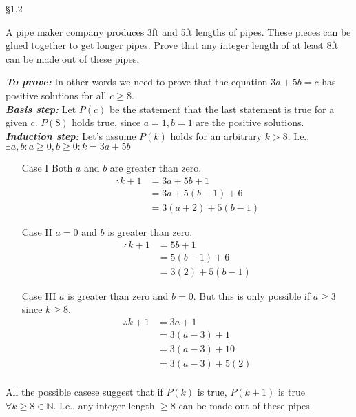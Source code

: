 \documentclass[boxes, qed]{homework}
\begin{document}
\newenvironment{amatrix}[1]{%
  \left[\begin{array}{@{}*{#1}{c}|c@{}}
}{%
  \end{array}\right]
}

\newenvironment{augmatrix}[1]{%
  \left[\begin{array}{#1}
}{%
  \end{array}\right]
}

\S1.2
\begin{problem}
    A pipe maker company produces 3ft and 5ft lengths of pipes. 
    These pieces can be glued together to get longer pipes. 
    Prove that any integer length of at least 8ft can be 
    made out of these pipes.
\end{problem}
\begin{solution}
    \textbf{\textit{To prove:}} In other words we need to prove that the equation
    $3a + 5b = c$
    has positive solutions for all $c \ge 8$.\\

    \textbf{\textit{Basis step:}} Let $P(c)$ be the statement that the last statement is true for
    a given $c$. $P(8)$ holds true, since $a=1, b=1$ 
    are the positive solutions.\\

    \textbf{\textit{Induction step:}} Let's assume $P(k)$ holds for an arbitrary
    $k>8$. I.e., 
    $\exists a,b
    : a\ge{0},b\ge{0}
    : k=3a+5b$

    \begin{enumerate}
        \item[Case I] Both $a$ and $b$ are greater than zero.
        \begin{align*}
            \therefore k+1 &= 3a + 5b + 1 \\
            & = 3a + 5(b-1) + 6 \\
            & = 3(a+2) + 5(b-1)
        \end{align*}
        \item[Case II] $a=0$ and $b$ is greater than zero.
        \begin{align*}
            \therefore k+1 &= 5b + 1 \\
            & = 5(b-1) + 6 \\
            & = 3(2) + 5(b-1)
        \end{align*}
        \item[Case III] $a$ is greater than zero and $b=0$. 
        But this is only possible if
        $a\ge{3}$ since $k\ge{8}$.
        \begin{align*}
            \therefore k+1 &= 3a + 1 \\
            & = 3(a-3) + 1 \\
            & = 3(a-3) + 10\\
            & = 3(a-3) + 5(2)\\
        \end{align*}
    \end{enumerate}
    All the possible casese suggest that if $P(k)$ is true,
    $P(k+1)$ is true $\forall{k}\ge{8}\in{\mathbb{N}}$.
    I.e., any integer length $\ge{8}$ can be made out of
    these pipes.
\end{solution}
\end{document}
